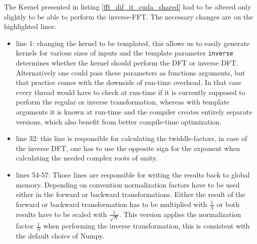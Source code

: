\documentclass[english,11pt,a4paper,table]{article} %
\begin{document}
The Kernel presented in listing \ref{fft_dif_it_cuda_shared} had to be altered only slightly to be able to perform the inverse-FFT.
The necessary changes are on the highlighted lines:
\begin{itemize}
	\item {line 1: changing the kernel to be templated, this allows us to easily generate kernels for various sizes of inputs and the template parameter \texttt{inverse} determines whether the kernel should perform the DFT or inverse DFT.
	      Alternatively one could pass these parameters as functions arguments, but that practice comes with the downside of run-time overhead.
	      In that case every thread would have to check at run-time if it is currently supposed to perform the regular or inverse transformation, whereas with template arguments it is known at run-time and the compiler creates entirely separate versions, which also benefit from better compile-time optimization.}
	\item {line 32: this line is responsible for calculating the twiddle-factors, in case of the inverse DFT, one has to use the opposite sign for the exponent when calculating the needed complex roots of unity.}
	\item {lines 54-57: Those lines are responsible for writing the results back to global memory. Depending on convention normalization factors have to be used either in the forward or backward transformations. Either the result of the forward or backward transformation has to be multiplied with $\frac{1}{N}$ or both results have to be scaled with $\frac{1}{\sqrt{N}}$. This version applies the normalization factor $\frac{1}{N}$ when performing the inverse transformation, this is consistent with the default choice of Numpy.}
\end{itemize}
\end{document}
